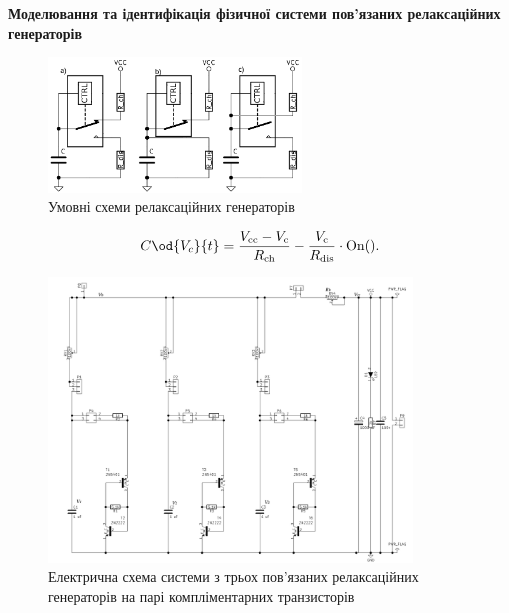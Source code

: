\documentclass[14pt,handout,utf8]{beamer}
\newcommand{\Tidx}[1]{%
  _\mathrm{#1}
}
\newcommand{\Xhead}[1]{
 \begin{center}%
      \textbf{#1}%
 \end{center}%
}
\newcommand{\RelaxBjtIi}{системи з трьох пов'язаних релаксаційних генераторів на парі компліментарних транзисторів}
\begin{document}
\begin{frame}
  \frametitle{~}
  \Xhead{Моделювання та ідентифікація фізичної системи пов'язаних релаксаційних генераторів}

  \begin{figure}
    \includegraphics[width=0.60\textwidth]{../p7/p/relax_types.png}
    \caption{Умовні схеми релаксаційних генераторів}
  \end{figure}

\begin{equation}
  C \od{V_c}{t}
  =
  \frac{V\Tidx{cc} - V\Tidx{c}}{R\Tidx{ch}}
  - \frac{V\Tidx{c}}{R\Tidx{dis}} \cdot \mathrm{On}().
  \label{atu:eq:relax0}
\end{equation}

  \begin{figure}
    \centerline{\includegraphics[width=0.86\textwidth]{../p7/p/relax3d_schem.png} }
    \caption{Електрична схема \RelaxBjtIi}
  \end{figure}


\end{frame}


\end{document}
